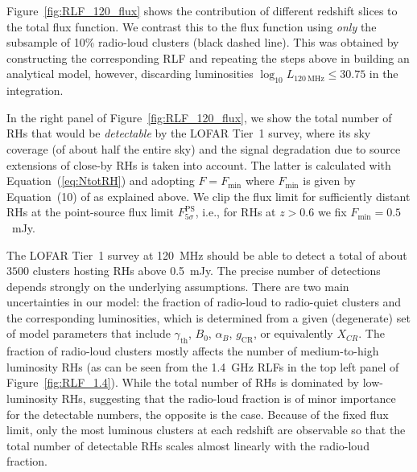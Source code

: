 \documentclass[traditabstract]{aa}
\newcommand{\rmn}{\mathrm}
\begin{document}
Figure~\ref{fig:RLF_120_flux} shows the contribution of different redshift
slices to the total flux function. We contrast this to the flux function using
\emph{only} the subsample of 10\% radio-loud clusters (black dashed line). This
was obtained by constructing the corresponding RLF and repeating the steps above
in building an analytical model, however, discarding luminosities $\log_{10}
L_{120~\rmn{MHz}} \leq 30.75$ in the integration.

In the right panel of Figure~\ref{fig:RLF_120_flux}, we show the total number of
RHs that would be \emph{detectable} by the LOFAR Tier~1 survey, where its sky
coverage (of about half the entire sky) and the signal degradation due to source
extensions of close-by RHs is taken into account. The latter is calculated with
Equation~(\ref{eq:NtotRH}) and adopting $F = F_{\rmn{min}}$ where
$F_{\rmn{min}}$ is given by Equation~(10) of \cite{2010A&A...509A..68C} as
explained above. We clip the flux limit for sufficiently distant RHs at the
point-source flux limit $F_{5\sigma}^{\rmn{PS}}$, i.e., for RHs at $z > 0.6$ we
fix $F_{\rmn{min}} = 0.5$~mJy.

The LOFAR Tier~1 survey at 120~MHz should be able to detect a total of about
$3500$ clusters hosting RHs above 0.5~mJy. The precise number of detections
depends strongly on the underlying assumptions. There are two main uncertainties
in our model: the fraction of radio-loud to radio-quiet clusters and the
corresponding luminosities, which is determined from a given (degenerate) set of
model parameters that include $\gamma_{\rmn{th}}$, $B_{0}$, $\alpha_{B}$,
$g_{\rmn{CR}}$, or equivalently $X_{CR}$. The fraction of radio-loud clusters
mostly affects the number of medium-to-high luminosity RHs (as can be seen from
the 1.4~GHz RLFs in the top left panel of Figure~\ref{fig:RLF_1.4}). While the
total number of RHs is dominated by low-luminosity RHs, suggesting that the
radio-loud fraction is of minor importance for the detectable
numbers, the opposite is the case. Because of the fixed flux limit, only the
most luminous clusters at each redshift are observable so that the total number
of detectable RHs scales almost linearly with the radio-loud fraction.

\end{document}
